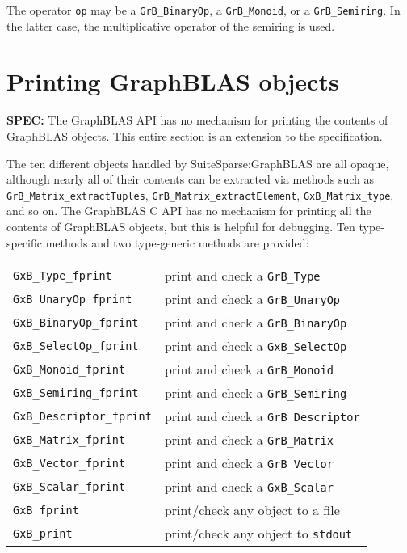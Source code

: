 \documentclass[12pt]{article}
\begin{document}
The operator \verb'op' may be a \verb'GrB_BinaryOp', a \verb'GrB_Monoid', or a
\verb'GrB_Semiring'.  In the latter case, the multiplicative operator of
the semiring is used.

\newpage
\section{Printing GraphBLAS objects} %
\label{fprint}

\begin{spec}
{\bf SPEC:} The GraphBLAS API has no mechanism for printing the contents of
GraphBLAS objects.  This entire section is an extension to the specification.
\end{spec}

The ten different objects handled by SuiteSparse:GraphBLAS are all opaque,
although nearly all of their contents can be extracted via methods such as
\verb'GrB_Matrix_extractTuples', \verb'GrB_Matrix_extractElement',
\verb'GxB_Matrix_type', and so on.  The GraphBLAS C API has no mechanism for
printing all the contents of GraphBLAS objects, but this is helpful for
debugging.  Ten type-specific methods and two type-generic methods are
provided:

\vspace{0.2in}
{\footnotesize
\begin{tabular}{ll}
\hline
\verb'GxB_Type_fprint'        & print and check a \verb'GrB_Type' \\
\verb'GxB_UnaryOp_fprint'     & print and check a \verb'GrB_UnaryOp' \\
\verb'GxB_BinaryOp_fprint'    & print and check a \verb'GrB_BinaryOp' \\
\verb'GxB_SelectOp_fprint'    & print and check a \verb'GxB_SelectOp' \\
\verb'GxB_Monoid_fprint'      & print and check a \verb'GrB_Monoid' \\
\verb'GxB_Semiring_fprint'    & print and check a \verb'GrB_Semiring' \\
\verb'GxB_Descriptor_fprint'  & print and check a \verb'GrB_Descriptor' \\
\verb'GxB_Matrix_fprint'      & print and check a \verb'GrB_Matrix' \\
\verb'GxB_Vector_fprint'      & print and check a \verb'GrB_Vector' \\
\verb'GxB_Scalar_fprint'      & print and check a \verb'GxB_Scalar' \\
\hline
\verb'GxB_fprint'             & print/check any object to a file \\
\verb'GxB_print'              & print/check any object to \verb'stdout' \\
\hline
\end{tabular}
}
\vspace{0.2in}
\end{document}
